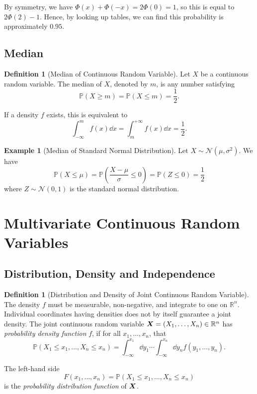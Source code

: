 \documentclass[11pt]{article}
\numberwithin{equation}{section}
\theoremstyle{definition}
\newtheorem{definition}[theorem]{Definition}
\newtheorem{example}[theorem]{Example}
\theoremstyle{remark}
\newcommand{\pqty}[1]{\left(#1\right)}
\newcommand{\RR}{\mathbb R}
\newcommand{\plusinfty}{+\infty}
\newcommand{\minusinfty}{-\infty}
\newcommand{\Prob}{\mathbb P}
\newcommand{\sNormCdf}{\Phi}
\newcommand{\Normal}{\mathcal N}
\begin{document}
By symmetry, we have \(\sNormCdf\pqty{x} + \sNormCdf\pqty{-x} = 2 \sNormCdf\pqty{0} = 1\), so this is equal to \(2 \sNormCdf\pqty{2} - 1\). Hence, by looking up tables, we can find this probability is approximately \(0.95\).

\subsection{Median}

\begin{definition}[Median of Continuous Random Variable]\label{probability-definition-050}
    \label{probability-def:median-continuous-rv}%
    Let \(X\) be a continuous random variable. The median of \(X\), denoted by \(m\), is any number satisfying
    \[
        \Prob\pqty{X \geq m} = \Prob\pqty{X \leq m} = \frac{1}{2}.
    \]

    If a density \(f\) exists, this is equivalent to
    \[
        \int_{\minusinfty}^{m} f\pqty{x} \dd{x} = \int_{m}^{\plusinfty} f\pqty{x} \dd{x} = \frac{1}{2}.
    \]
\end{definition}

\begin{example}[Median of Standard Normal Distribution]\label{probability-example-036}
    \label{probability-ex:median-standard-normal}%
    Let \(X \sim \Normal\pqty{\mu, \sigma^2}\). We have
    \[
        \Prob\pqty{X \leq \mu} = \Prob\pqty{\frac{X - \mu}{\sigma} \leq 0} = \Prob\pqty{Z \leq 0} = \frac{1}{2}
    \]
    where \(Z \sim \Normal\pqty{0, 1}\) is the standard normal distribution.
\end{example}

\section{Multivariate Continuous Random Variables}\label{probability-section-12}

\subsection{Distribution, Density and Independence}

\begin{definition}[Distribution and Density of Joint Continuous Random Variable]\label{probability-definition-051}
    \label{probability-def:distribution-density-joint-crv}%
The density \(f\) must be measurable, non-negative, and integrate to one on \(\RR^n\). Individual coordinates having densities does not by itself guarantee a joint density.
    The joint continuous random variable \(\vb{X} = \pqty{X_1, \ldots, X_n} \in \RR^n\) has \emph{probability density function} \(f\), if for all \(x_1, \ldots, x_n\), that
    \[
        \Prob\pqty{X_1 \leq x_1, \ldots, X_n \leq x_n} = \int_{\minusinfty}^{x_1} \dd{y_1} \cdots \int_{\minusinfty}^{x_n} \dd{y_n} f\pqty{y_1, \ldots, y_n}.
    \]

    The left-hand side
    \[
        F \pqty{x_1, \ldots, x_n} = \Prob\pqty{X_1 \leq x_1, \ldots, X_n \leq x_n}
    \]
    is the \emph{probability distribution function} of \(\vb{X}\).
\end{definition}
\end{document}
